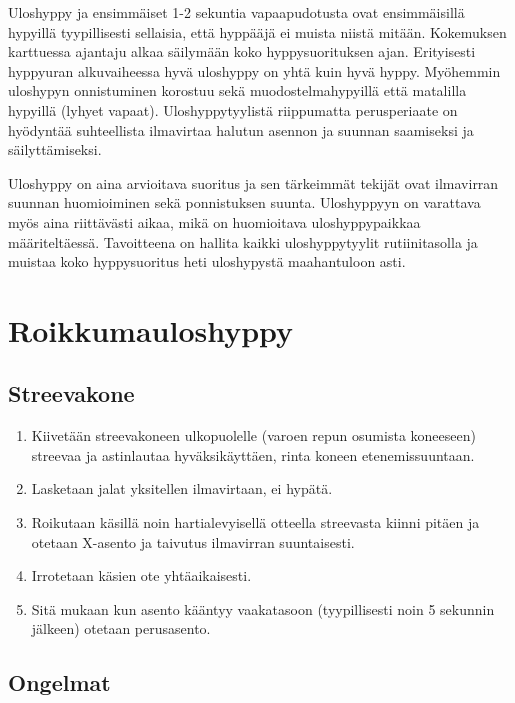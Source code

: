 
Uloshyppy ja ensimmäiset 1-2 sekuntia vapaapudotusta ovat ensimmäisillä hypyillä tyypillisesti sellaisia, että hyppääjä ei muista niistä mitään. Kokemuksen karttuessa ajantaju alkaa säilymään koko hyppysuorituksen ajan. Erityisesti hyppyuran alkuvaiheessa hyvä uloshyppy on yhtä kuin hyvä hyppy. Myöhemmin uloshypyn onnistuminen korostuu sekä muodostelmahypyillä että matalilla hypyillä (lyhyet vapaat). Uloshyppytyylistä riippumatta perusperiaate on hyödyntää suhteellista ilmavirtaa halutun asennon ja suunnan saamiseksi ja säilyttämiseksi. 


Uloshyppy on aina arvioitava suoritus ja sen tärkeimmät tekijät ovat ilmavirran suunnan huomioiminen sekä ponnistuksen suunta. Uloshyppyyn on varattava myös aina riittävästi aikaa, mikä on huomioitava uloshyppypaikkaa määriteltäessä. Tavoitteena on hallita kaikki uloshyppytyylit rutiinitasolla ja muistaa koko hyppysuoritus heti uloshypystä maahantuloon asti. 

\section{ Roikkumauloshyppy }
\label{uloshyppytyylit-roikkumauloshyppy}

\subsection{ Streevakone }
\label{uloshyppytyylit-streevakone}

\begin{enumerate}[label=\bfseries \arabic*)]
\item  Kiivetään streevakoneen ulkopuolelle (varoen repun osumista koneeseen) streevaa ja astinlautaa hyväksikäyttäen, rinta koneen etenemissuuntaan. 
\item  Lasketaan jalat yksitellen ilmavirtaan, ei hypätä. 
\item  Roikutaan käsillä noin hartialevyisellä otteella streevasta kiinni pitäen ja otetaan X-asento ja taivutus ilmavirran suuntaisesti. 
\item  Irrotetaan käsien ote yhtäaikaisesti. 
\item  Sitä mukaan kun asento kääntyy vaakatasoon (tyypillisesti noin 5 sekunnin jälkeen) otetaan perusasento. 
\end{enumerate}
\subsection{ Ongelmat }
\label{uloshyppytyylit-ongelmat}

